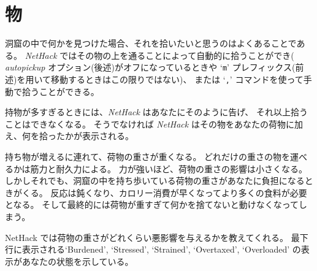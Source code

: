 \section{物}

洞窟の中で何かを見つけた場合、それを拾いたいと思うのはよくあることである。
{\it NetHack\/} ではその物の上を通ることによって自動的に拾うことができ(
{\it autopickup\/} オプション(後述)がオフになっているときや
`{\tt m}' プレフィックス(前述)を用いて移動するときはこの限りではない)、
または `{\tt ,}' コマンドを使って手動で拾うことができる。

持物が多すぎるときには、{\it NetHack\/} はあなたにそのように告げ、
それ以上拾うことはできなくなる。
そうでなければ {\it NetHack\/} はその物をあなたの荷物に加え、何を拾ったかが表示される。

持ち物が増えるに連れて、荷物の重さが重くなる。
どれだけの重さの物を運べるかは筋力と耐久力による。
力が強いほど、荷物の重さの影響は小さくなる。
しかしそれでも、洞窟の中を持ち歩いている荷物の重さがあなたに負担になるときがくる。
反応は鈍くなり、カロリー消費が早くなってより多くの食料が必要となる。
そして最終的には荷物が重すぎて何かを捨てないと動けなくなってしまう。

NetHack では荷物の重さがどれくらい悪影響を与えるかを教えてくれる。
最下行に表示される`Burdened', `Stressed', `Strained', `Overtaxed', `Overloaded'
の表示があなたの状態を示している。

